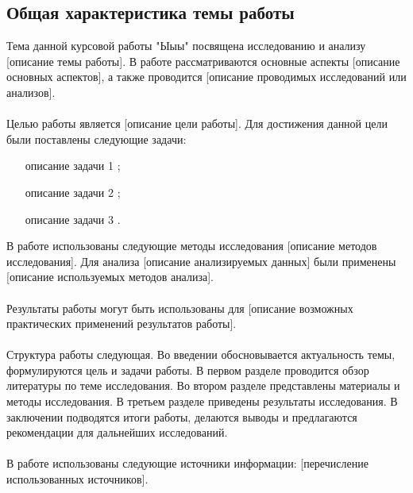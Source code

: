 \documentclass{article}
\begin{document}
\subsection{Общая характеристика темы работы}
Тема данной курсовой работы "{}{}Ыыы"{}{} посвящена исследованию и анализу [описание темы работы]. В работе рассматриваются основные аспекты [описание основных аспектов], а также проводится [описание проводимых исследований или анализов].\\
~\\
Целью работы является [описание цели работы]. Для достижения данной цели были поставлены следующие задачи:
\begin{enumerate}
\item [описание задачи 1];
\item [описание задачи 2];
\item [описание задачи 3].
\end{enumerate}
В работе использованы следующие методы исследования [описание методов исследования]. Для анализа [описание анализируемых данных] были применены [описание используемых методов анализа].\\
~\\
Результаты работы могут быть использованы для [описание возможных практических применений результатов работы].\\
~\\
Структура работы следующая. Во введении обосновывается актуальность темы, формулируются цель и задачи работы. В первом разделе проводится обзор литературы по теме исследования. Во втором разделе представлены материалы и методы исследования. В третьем разделе приведены результаты исследования. В заключении подводятся итоги работы, делаются выводы и предлагаются рекомендации для дальнейших исследований.\\
~\\
В работе использованы следующие источники информации: [перечисление использованных источников].
\end{document}
